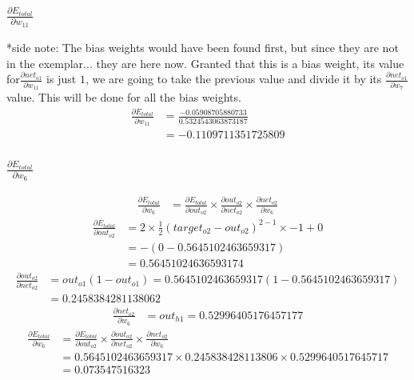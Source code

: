 \documentclass{article}
\begin{document}
\subsubsection{$\frac{\partial E_{total}}{\partial w_{11}}$}
*side note: The bias weights would have been found first, but since they are not
in the exemplar... they are here now.
Granted that this is a bias weight, its value for$
    \frac{\partial net_{o1}}{\partial w_{11}} 
$ is just $1$, we are going to take the previous value and divide it by its 
$\frac{\partial net_{o1}}{\partial w_7} $ value. This will be done for all the
bias weights.
\begin{align*}
    \frac{\partial E_{total}}{\partial w_{11}} 
    & = \frac{-0.05908705880733}{0.5324543063873187} \\
    & = -0.1109711351725809
\end{align*}


\subsubsection{$\frac{\partial E_{total}}{\partial w_6}$}

\begin{align*}
    \frac{\partial E_{total}}{\partial w_6} & =
    \frac{\partial E_{total}}{\partial out_{o2}} \times
    \frac{\partial out_{o2}}{\partial net_{o2}} \times
    \frac{\partial net_{o2}}{\partial w_6} 
\end{align*}
\begin{align*}
    \frac{\partial E_{total}}{\partial out_{o2}}
    & = 2 \times \frac{1}{2}(target_{o2} - out_{o2})^{2 - 1} \times -1 + 0 \\
    & = -(0- 0.5645102463659317) \\ & = 0.56451024636593174
\end{align*}
\begin{align*}
    \frac{\partial out_{o2}}{\partial net_{o2}} 
    & = out_{o1}(1 - out_{o1}) = 0.5645102463659317(1- 0.5645102463659317) \\
    & =0.2458384281138062
\end{align*}
\begin{align*}
    \frac{\partial net_{o2}}{\partial w_6} 
    & = out_{h1} =  0.52996405176457177
\end{align*}
\begin{align*}
    \frac{\partial E_{total}}{\partial w_6} & =
    \frac{\partial E_{total}}{\partial out_{o2}} \times
    \frac{\partial out_{o2}}{\partial net_{o2}} \times
    \frac{\partial net_{o2}}{\partial w_6} \\
    & = 0.5645102463659317 \times 0.245838428113806 \times 0.5299640517645717 \\
    & = 0.073547516323
\end{align*}
\end{document}
